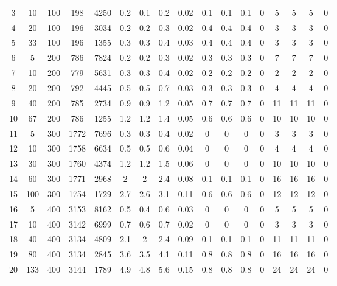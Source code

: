 \documentclass[11pt]{article}
\newcommand{\np}{\newpage}
\begin{document}
\begin{appendices}
\begin{landscape}
\begin{longtable}[c]{ccccc|cccc|cccc|cccc}
				3 & 10 & 100 & 198 & 4250 & 0.2 & 0.1 & 0.2 & 0.02 & 0.1 & 0.1 & 0.1 & 0 & 5 & 5 & 5 & 0 \\
				\rowcolor[HTML]{EFEFEF} 
				4 & 20 & 100 & 196 & 3034 & 0.2 & 0.2 & 0.3 & 0.02 & 0.4 & 0.4 & 0.4 & 0 & 3 & 3 & 3 & 0 \\
				\rowcolor[HTML]{EFEFEF} 
				5 & 33 & 100 & 196 & 1355 & 0.3 & 0.3 & 0.4 & 0.03 & 0.4 & 0.4 & 0.4 & 0 & 3 & 3 & 3 & 0 \\
				6 & 5 & 200 & 786 & 7824 & 0.2 & 0.2 & 0.3 & 0.02 & 0.3 & 0.3 & 0.3 & 0 & 7 & 7 & 7 & 0 \\
				7 & 10 & 200 & 779 & 5631 & 0.3 & 0.3 & 0.4 & 0.02 & 0.2 & 0.2 & 0.2 & 0 & 2 & 2 & 2 & 0 \\
				8 & 20 & 200 & 792 & 4445 & 0.5 & 0.5 & 0.7 & 0.03 & 0.3 & 0.3 & 0.3 & 0 & 4 & 4 & 4 & 0 \\
				9 & 40 & 200 & 785 & 2734 & 0.9 & 0.9 & 1.2 & 0.05 & 0.7 & 0.7 & 0.7 & 0 & 11 & 11 & 11 & 0 \\
				10 & 67 & 200 & 786 & 1255 & 1.2 & 1.2 & 1.4 & 0.05 & 0.6 & 0.6 & 0.6 & 0 & 10 & 10 & 10 & 0 \\
				\rowcolor[HTML]{EFEFEF} 
				11 & 5 & 300 & 1772 & 7696 & 0.3 & 0.3 & 0.4 & 0.02 & 0 & 0 & 0 & 0 & 3 & 3 & 3 & 0 \\
				\rowcolor[HTML]{EFEFEF} 
				12 & 10 & 300 & 1758 & 6634 & 0.5 & 0.5 & 0.6 & 0.04 & 0 & 0 & 0 & 0 & 4 & 4 & 4 & 0 \\
				\rowcolor[HTML]{EFEFEF} 
				13 & 30 & 300 & 1760 & 4374 & 1.2 & 1.2 & 1.5 & 0.06 & 0 & 0 & 0 & 0 & 10 & 10 & 10 & 0 \\
				\rowcolor[HTML]{EFEFEF} 
				14 & 60 & 300 & 1771 & 2968 & 2 & 2 & 2.4 & 0.08 & 0.1 & 0.1 & 0.1 & 0 & 16 & 16 & 16 & 0 \\
				\rowcolor[HTML]{EFEFEF} 
				15 & 100 & 300 & 1754 & 1729 & 2.7 & 2.6 & 3.1 & 0.11 & 0.6 & 0.6 & 0.6 & 0 & 12 & 12 & 12 & 0 \\
				16 & 5 & 400 & 3153 & 8162 & 0.5 & 0.4 & 0.6 & 0.03 & 0 & 0 & 0 & 0 & 5 & 5 & 5 & 0 \\
				17 & 10 & 400 & 3142 & 6999 & 0.7 & 0.6 & 0.7 & 0.02 & 0 & 0 & 0 & 0 & 3 & 3 & 3 & 0 \\
				18 & 40 & 400 & 3134 & 4809 & 2.1 & 2 & 2.4 & 0.09 & 0.1 & 0.1 & 0.1 & 0 & 11 & 11 & 11 & 0 \\
				19 & 80 & 400 & 3134 & 2845 & 3.6 & 3.5 & 4.1 & 0.11 & 0.8 & 0.8 & 0.8 & 0 & 16 & 16 & 16 & 0 \\
				20 & 133 & 400 & 3144 & 1789 & 4.9 & 4.8 & 5.6 & 0.15 & 0.8 & 0.8 & 0.8 & 0 & 24 & 24 & 24 & 0 \\ \np

\end{longtable}
\end{landscape}
\end{appendices}
\end{document}
